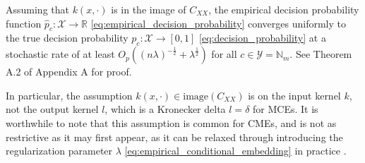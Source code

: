 \documentclass{llncs}
\begin{document}
	
	
	\begin{theorem}
		\label{thm:probability_convergence_copy}
		Assuming that $k(x, \cdot)$ is in the image of $C_{XX}$, the empirical decision probability function $\hat{p}_{c} : \mathcal{X} \to \mathbb{R}$ \eqref{eq:empirical_decision_probability} converges uniformly to the true decision probability $p_{c} : \mathcal{X} \to [0, 1]$ \eqref{eq:decision_probability} at a stochastic rate of at least $O_{p}((n \lambda)^{-\frac{1}{2}} + \lambda^{\frac{1}{2}})$ for all $c \in \mathcal{Y} = \mathbb{N}_{m}$. See Theorem A.2 of Appendix A for proof.
	\end{theorem}
	
	In particular, the assumption $k(x, \cdot) \in \mathrm{image}(C_{XX})$ is on the input kernel $k$, not the output kernel $l$, which is a Kronecker delta $l = \delta$ for \glspl{MCE}. It is worthwhile to note that this assumption is common for \glspl{CME}, and is not as restrictive as it may first appear, as it can be relaxed through introducing the regularization parameter $\lambda$ \eqref{eq:empirical_conditional_embedding} in practice \citep[p.74-75, Sec. 3 and 3.1 \textit{resp.}]{song2009hilbert, song2013kernel, muandet2016kernel}.
	
\end{document}
